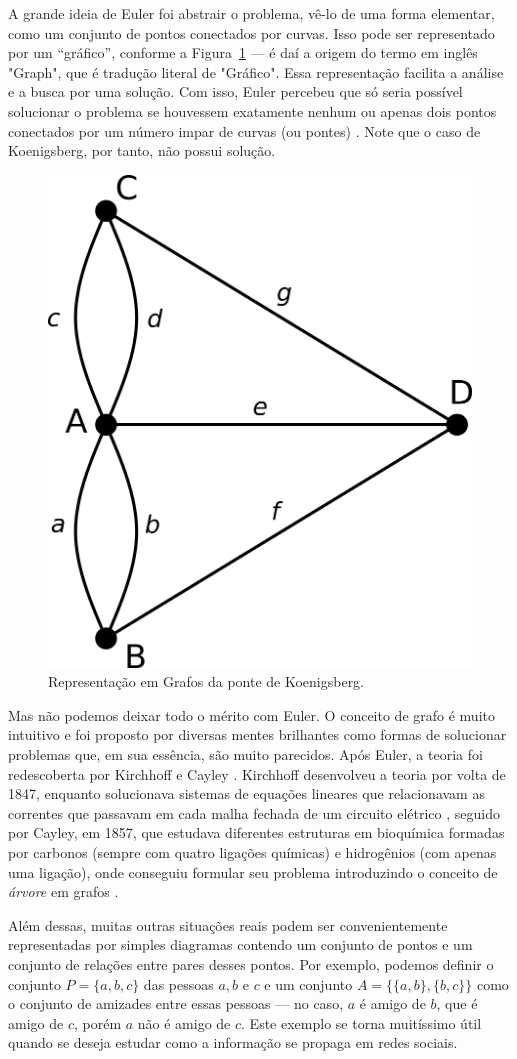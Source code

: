 \documentclass[a4paper,12pt]{article}
\begin{document}
A grande ideia de Euler foi abstrair o problema, vê-lo de uma forma elementar, como um conjunto de pontos conectados por curvas. Isso pode ser representado por um ``gráfico'', conforme a Figura~\ref{fig:koniGrafo} --- é daí a origem do termo em inglês "Graph", que é tradução literal de "Gráfico". Essa representação facilita a análise e a busca por uma solução. Com isso, Euler percebeu que só seria possível solucionar o problema se houvessem exatamente nenhum ou apenas dois pontos conectados por um número impar de curvas (ou pontes) \cite{euler:KOENIGSBERG}. Note que o caso de Koenigsberg, por tanto, não possui solução.

\begin{figure}[H]
	\begin{center}
		\includegraphics[width=0.32\linewidth]{koenigsbernGrafo.png}
	\end{center}
	\caption{Representação em Grafos da ponte de Koenigsberg.}
	\label{fig:koniGrafo}
\end{figure}

Mas não podemos deixar todo o mérito com Euler. O conceito de grafo é muito intuitivo e foi proposto por diversas mentes brilhantes como formas de solucionar problemas que, em sua essência, são muito parecidos. Após Euler, a teoria foi redescoberta por Kirchhoff e Cayley \cite{graphTheoryFHarary}. Kirchhoff desenvolveu a teoria por volta de 1847, enquanto solucionava sistemas de equações lineares que relacionavam as correntes que passavam em cada malha fechada de um circuito elétrico \cite{kirchhoff1847ueber}, seguido por Cayley, em 1857, que estudava diferentes estruturas em bioquímica formadas por carbonos (sempre com quatro ligações químicas) e hidrogênios (com apenas uma ligação), onde conseguiu formular seu problema introduzindo o conceito de \textit{árvore} em grafos \cite{cayley1897theory}.  

Além dessas, muitas outras situações reais podem ser convenientemente representadas por simples diagramas contendo um conjunto de pontos e um conjunto de relações entre pares desses pontos. Por exemplo, podemos definir o conjunto $P = \{a,b,c\}$ das pessoas $a, b$ e $c$ e um conjunto $A = \{\{a,b\}, \{b,c\}\}$ como o conjunto de amizades entre essas pessoas --- no caso, $a$ é amigo de $b$, que é amigo de $c$, porém $a$ não é amigo de $c$. 
Este exemplo se torna muitíssimo útil quando se deseja estudar como a informação se propaga em redes sociais.
\end{document}
